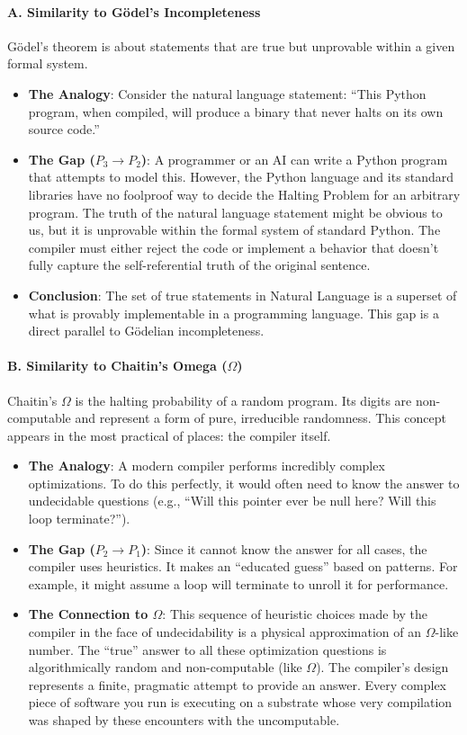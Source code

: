 \documentclass[11pt,letterpaper]{article}
\begin{document}
\begin{itemize}
\paragraph{A. Similarity to Gödel’s Incompleteness}
Gödel’s theorem is about statements that are true but unprovable within a given formal system.
\begin{itemize}
    \item \textbf{The Analogy}: Consider the natural language statement: “This Python program, when compiled, will produce a binary that never halts on its own source code.”
    \item \textbf{The Gap ($P_3 \to P_2$)}: A programmer or an AI can write a Python program that attempts to model this. However, the Python language and its standard libraries have no foolproof way to decide the Halting Problem for an arbitrary program. The truth of the natural language statement might be obvious to us, but it is unprovable within the formal system of standard Python. The compiler must either reject the code or implement a behavior that doesn’t fully capture the self-referential truth of the original sentence.
    \item \textbf{Conclusion}: The set of true statements in Natural Language is a superset of what is provably implementable in a programming language. This gap is a direct parallel to Gödelian incompleteness.
\end{itemize}

\paragraph{B. Similarity to Chaitin’s Omega ($\Omega$)}
Chaitin’s $\Omega$ is the halting probability of a random program. Its digits are non-computable and represent a form of pure, irreducible randomness. This concept appears in the most practical of places: the compiler itself.
\begin{itemize}
    \item \textbf{The Analogy}: A modern compiler performs incredibly complex optimizations. To do this perfectly, it would often need to know the answer to undecidable questions (e.g., “Will this pointer ever be null here? Will this loop terminate?”).
    \item \textbf{The Gap ($P_2 \to P_1$)}: Since it cannot know the answer for all cases, the compiler uses heuristics. It makes an “educated guess” based on patterns. For example, it might assume a loop will terminate to unroll it for performance.
    \item \textbf{The Connection to $\Omega$}: This sequence of heuristic choices made by the compiler in the face of undecidability is a physical approximation of an $\Omega$-like number. The “true” answer to all these optimization questions is algorithmically random and non-computable (like $\Omega$). The compiler’s design represents a finite, pragmatic attempt to provide an answer. Every complex piece of software you run is executing on a substrate whose very compilation was shaped by these encounters with the uncomputable.
\end{itemize}


\end{itemize}
\end{document}
